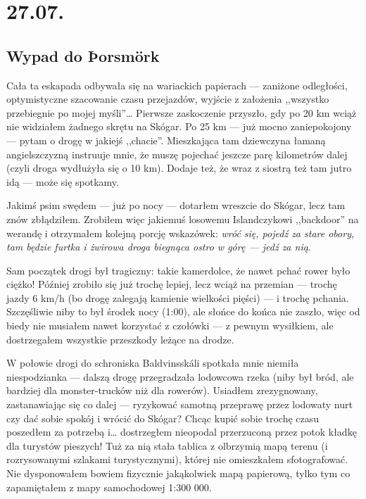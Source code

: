 \chapter*{27.07.}

\section*{Wypad do Þorsmörk}


Cała ta eskapada odbywała się na wariackich papierach --- zaniżone odległości, optymistyczne szacowanie czasu przejazdów, wyjście z założenia ,,wszystko przebiegnie po mojej myśli''… Pierwsze zaskoczenie przyszło, gdy po 20 km wciąż nie widziałem żadnego skrętu na Skógar. Po 25 km --- już mocno zaniepokojony --- pytam o drogę w jakiejś ,,chacie''. Mieszkająca tam dziewczyna łamaną angielszczyzną instruuje mnie, że muszę pojechać jeszcze parę kilometrów dalej (czyli droga wydłużyła się o 10 km). Dodaje też, że wraz z siostrą też tam jutro idą --- może się spotkamy.

Jakimś psim swędem --- już po nocy --- dotarłem wreszcie do Skógar, lecz tam znów zbłądziłem. Zrobiłem więc jakiemuś losowemu Islandczykowi ,,backdoor'' na werandę i otrzymałem kolejną porcję wskazówek: \emph{wróć się, pojedź za stare obory, tam będzie furtka i żwirowa droga biegnąca ostro w górę --- jedź za nią}.

Sam początek drogi był tragiczny: takie kamerdolce, że nawet pchać rower było ciężko! Później zrobiło się już trochę lepiej, lecz wciąż na przemian --- trochę jazdy 6 km/h (bo drogę zalegają kamienie wielkości pięści) --- i trochę pchania. Szczęśliwie niby to był środek nocy (1:00), ale słońce do końca nie zaszło, więc od biedy nie musiałem nawet korzystać z czołówki --- z pewnym wysiłkiem, ale dostrzegałem wszystkie przeszkody leżące na drodze.

W połowie drogi do schroniska Baldvinsskáli spotkała mnie niemiła niespodzianka --- dalszą drogę przegradzała lodowcowa rzeka (niby był bród, ale bardziej dla monster-trucków niż dla rowerów). Usiadłem zrezygnowany, zastanawiając się co dalej --- ryzykować samotną przeprawę przez lodowaty nurt czy dać sobie spokój i wrócić do Skógar? Chcąc kupić sobie trochę czasu poszedłem za potrzebą i… dostrzegłem nieopodal przerzuconą przez potok kładkę dla turystów pieszych! Tuż za nią stała tablica z olbrzymią mapą terenu (i rozrysowanymi szlakami turystycznymi), której nie omieszkałem sfotografować. Nie dysponowałem bowiem fizycznie jakąkolwiek mapą papierową, tylko tym co zapamiętałem z mapy samochodowej 1:300 000.

